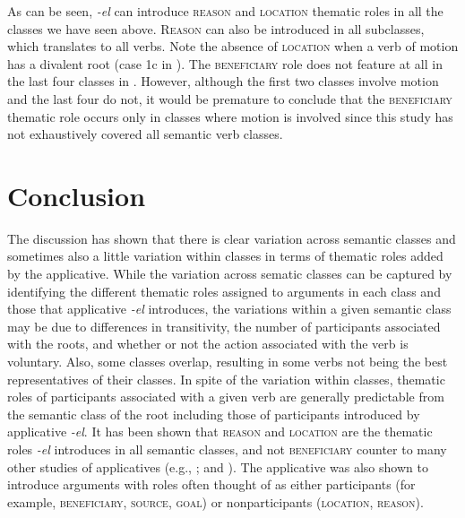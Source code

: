 \documentclass[output=paper]{langsci/langscibook}
\begin{document}
As can be seen, \textit{-el} can introduce \textsc{reason} and \textsc{location} thematic roles in all the classes we have seen above. \textsc{Reason} can also be introduced in all subclasses, which translates to all verbs. Note the absence of \textsc{location} when a verb of motion has a divalent root (case 1c in ). The \textsc{beneficiary} role does not feature at all in the last four classes in . However, although the first two classes involve motion and the last four do not, it would be premature to conclude that the \textsc{beneficiary} thematic role occurs only in classes where motion is involved since this study has not exhaustively covered all semantic verb classes.

\newpage 
\largerpage
\section{Conclusion}\label{sec:sibanda:5}
The discussion has shown that there is clear variation across semantic classes and sometimes also a little variation within classes in terms of thematic roles added by the applicative. While the variation across sematic classes can be captured by identifying the different thematic roles assigned to arguments in each class and those that applicative \textit{-el} introduces, the variations within a given semantic class may be due to differences in transitivity, the number of participants associated with the roots, and whether or not the action associated with the verb is voluntary. Also, some classes overlap, resulting in some verbs not being the best representatives of their classes. In spite of the variation within classes, thematic roles of participants associated with a given  verb are generally predictable from the semantic class of the root including those of participants introduced by applicative \textit{-el}. It has been shown that \textsc{reason} and \textsc{location} are the thematic roles \textit{-el} introduces in all semantic classes, and not \textsc{beneficiary} counter to many other studies of applicatives (e.g., \citealt{Schadeberg2003,Peterson2007,Polinsky2008,KittilaZuniga2010,deKindBostoen2012}; and \citealt{MartenKula2014}). The  applicative was also shown to introduce arguments with roles often thought of as either participants (for example, \textsc{beneficiary}, \textsc{source}, \textsc{goal}) or nonparticipants (\textsc{location}, \textsc{reason}). 
\end{document}
